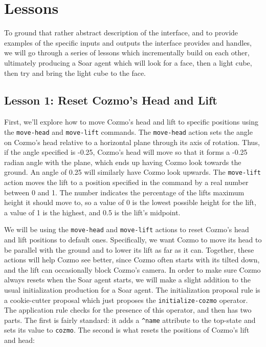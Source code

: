 \hypertarget{lessons}{%
\section{Lessons}\label{lessons}}

To ground that rather abstract description of the interface, and to
provide examples of the specific inputs and outputs the interface
provides and handles, we will go through a series of lessons which
incrementally build on each other, ultimately producing a Soar agent
which will look for a face, then a light cube, then try and bring the
light cube to the face.

\hypertarget{lesson-1-reset-cozmos-head-and-lift}{%
\subsection{Lesson 1: Reset Cozmo's Head and
Lift}\label{lesson-1-reset-cozmos-head-and-lift}}

First, we'll explore how to move Cozmo's head and lift to specific
positions using the \texttt{move-head} and \texttt{move-lift} commands.
The \texttt{move-head} action sets the angle on Cozmo's head relative to
a horizontal plane through its axis of rotation. Thus, if the angle
specified is -0.25, Cozmo's head will move so that it forms a -0.25
radian angle with the plane, which ends up having Cozmo look towards the
ground. An angle of 0.25 will similarly have Cozmo look upwards. The
\texttt{move-lift} action moves the lift to a position specified in the
command by a real number between 0 and 1. The number indicates the
percentage of the lifts maximum height it should move to, so a value of
0 is the lowest possible height for the lift, a value of 1 is the
highest, and 0.5 is the lift's midpoint.

We will be using the \texttt{move-head} and \texttt{move-lift} actions
to reset Cozmo's head and lift positions to default ones. Specifically,
we want Cozmo to move its head to be parallel with the ground and to
lower its lift as far as it can. Together, these actions will help Cozmo
see better, since Cozmo often starts with its tilted down, and the lift
can occasionally block Cozmo's camera. In order to make sure Cozmo
always resets when the Soar agent starts, we will make a slight addition
to the usual initialization production for a Soar agent. The
initialization proposal rule is a cookie-cutter proposal which just
proposes the \texttt{initialize-cozmo} operator. The application rule
checks for the presence of this operator, and then has two parts. The
first is fairly standard: it adds a \texttt{\^{}name} attribute to the
top-state and sets its value to \texttt{cozmo}. The second is what
resets the positions of Cozmo's lift and head:

